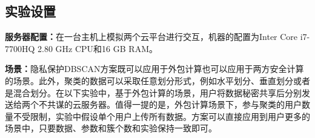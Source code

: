 %
%
%
%
%
\subsection{实验设置}
\textbf{服务器配置：}在一台主机上模拟两个云平台进行交互，机器的配置为Inter Core i7-7700HQ 2.80 GHz CPU和16 GB RAM。

\textbf{场景：}隐私保护DBSCAN方案既可以应用于外包计算也可以应用于两方安全计算的场景。此外，聚类的数据可以采取任意划分形式，例如水平划分、垂直划分或者是混合划分。在以下实验中，基于外包计算的场景，用户将数据秘密共享后分别发送给两个不共谋的云服务器。值得一提的是，外包计算场景下，参与聚类的用户数量不受限制，实验中假设单个用户上传所有数据。方案可以直接应用到用户更多的场景中，只要数据、参数和簇个数和实验保持一致即可。

